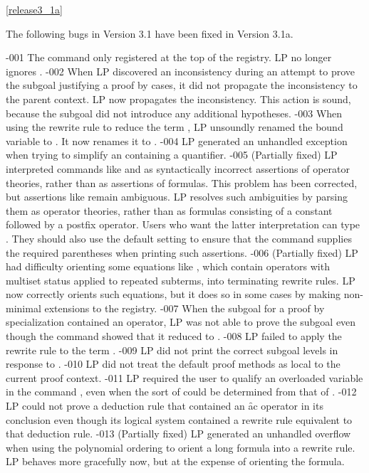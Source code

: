\ref{release3_1a}

The following bugs in Version 3.1 have been fixed in Version 3.1a.
\begin{description}
-001
\dd 
The command  only registered  at the top of the
registry.  LP no longer ignores .
-002
\dd 
When LP discovered an inconsistency during an attempt to prove the subgoal
justifying a proof by cases, it did not propagate the inconsistency to the
parent context.  LP now propagates the inconsistency.  This action is sound,
because the subgoal did not introduce any additional hypotheses.
-003
\dd 
When using the rewrite rule  to reduce the term
, LP unsoundly renamed the bound variable  to .  It now
renames it to .
-004
\dd 
LP generated an unhandled exception when trying to simplify an
 containing a quantifier.
-005 (Partially fixed)
\dd 
LP interpreted commands like  and 
 as syntactically incorrect assertions of operator 
theories, rather than as assertions of formulas.  This problem has been
corrected, but assertions like  remain ambiguous.  LP resolves
such ambiguities by parsing them as operator theories, rather than as formulas
consisting of a constant followed by a postfix operator.  Users who want the
latter interpretation can type .  They should also use the
default  setting to ensure that the 
command supplies the required parentheses when printing such assertions.
-006 (Partially fixed)
\dd 
LP had difficulty orienting some equations like , which
contain operators with multiset status applied to repeated subterms, into
terminating rewrite rules.  LP now correctly orients such equations, but it
does so in some cases by making non-minimal extensions to the registry.
-007
\dd 
When the subgoal for a proof by specialization contained an  operator,
LP was not able to prove the subgoal even though the 
command showed that it reduced to .
-008
\dd 
LP failed to apply the rewrite rule  to the term
.
-009
\dd 
LP did not print the correct subgoal levels in response to .
-010
\dd 
LP did not treat the default proof methods as local to the current proof
context.
-011
\dd 
LP required the user to qualify an overloaded variable  in the command
, even when the sort of  could be determined
from that of .
-012
\dd 
LP could not prove a deduction rule that contained an \f{ac} operator in its
conclusion even though its logical system contained a rewrite rule equivalent
to that deduction rule.
-013 (Partially fixed)
\dd 
LP generated an unhandled overflow when using the polynomial ordering to orient
a long formula into a rewrite rule.  LP behaves more gracefully now, but at the
expense of orienting the formula.
\end{description}


